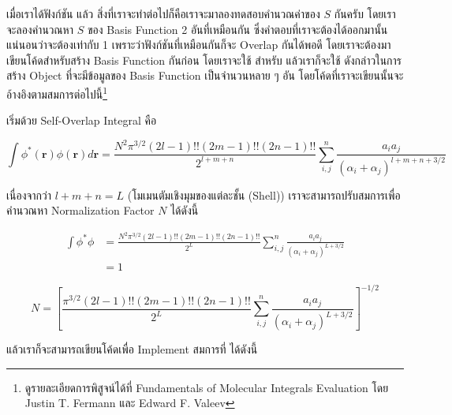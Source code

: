 \vspace{5pt}

เมื่อเราได้ฟังก์ชัน  แล้ว สิ่งที่เราจะทำต่อไปก็คือเราจะมาลองทดสอบคำนวณค่าของ $S$ กันครับ โดยเราจะลองคำนวณหา $S$
ของ Basis Function 2 อันที่เหมือนกัน ซึ่งคำตอบที่เราจะต้องได้ออกมานั้นแน่นอนว่าจะต้องเท่ากับ 1 เพราะว่าฟังก์ชันที่เหมือนกันก็จะ Overlap
กันได้พอดี โดยเราจะต้องมาเขียนโค้ดสำหรับสร้าง Basis Function กันก่อน โดยเราจะใช้  สำหรับ 
แล้วเราก็จะใช้  ดังกล่าวในการสร้าง Object ที่จะมีข้อมูลของ  Basis Function เป็นจำนวนหลาย ๆ อัน
โดยโค้ดที่เราจะเขียนนั้นจะอ้างอิงตามสมการต่อไปนี้\footnote{ดูรายละเอียดการพิสูจน์ได้ที่ Fundamentals of Molecular Integrals Evaluation
  โดย Justin T. Fermann และ Edward F. Valeev\autocite{fermann2020}}

เริ่มด้วย Self-Overlap Integral คือ

\begin{equation}
  \int \phi^*(\mathbf{r}) \phi(\mathbf{r}) d \mathbf{r}
  =
  \frac{N^2 \pi^{3 / 2}(2 l-1) ! !(2 m-1) ! !(2 n-1) ! !}{2^{l+m+n}}
  \sum_{i, j}^n \frac{a_i a_j}{\left(\alpha_i+\alpha_j\right)^{l+m+n+3 / 2}}
\end{equation}

\noindent เนื่องจากว่า $l + m + n = L$ (โมเมนตัมเชิงมุมของแต่ละชั้น (Shell)) เราจะสามารถปรับสมการเพื่อคำนวณหา Normalization
Factor $N$ ได้ดังนี้

\begin{align}
  \int \phi^* \phi
   & =
  \frac{N^2 \pi^{3 / 2}(2 l-1) ! !(2 m-1) ! !(2 n-1) ! !}{2^L}
  \sum_{i, j}^n \frac{a_i a_j}{\left(\alpha_i+\alpha_j\right)^{L+3 / 2}} \\
   & =
  1
\end{align}

\begin{equation}
  N
  =
  \left[
    \frac{\pi^{3 / 2}(2 l-1) ! !(2 m-1) ! !(2 n-1) ! !}{2^L}
    \sum_{i, j}^n \frac{a_i a_j}{\left(\alpha_i+\alpha_j\right)^{L+3 / 2}}
    \right]^{-1 / 2}
\end{equation}

\noindent แล้วเราก็จะสามารถเขียนโค้ดเพื่อ Implement สมการที่ ได้ดังนี้

\vspace{5pt}

